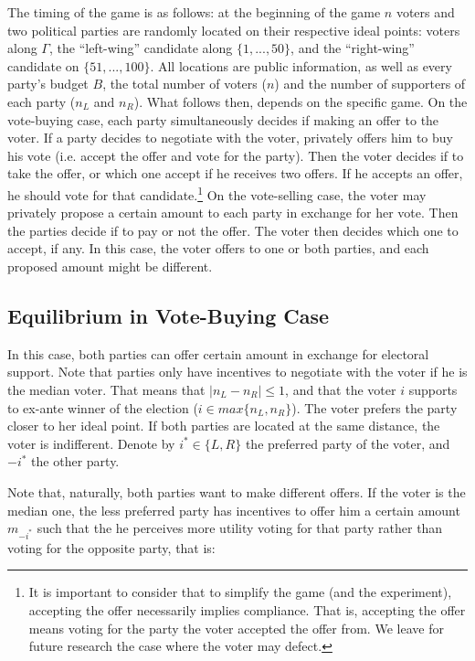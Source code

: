 \documentclass[onesided]{article}\usepackage[]{graphicx}\usepackage[]{color}
\begin{document}
The timing of the game is as follows: at the beginning of the game $n$ voters and two political parties are randomly located on their respective ideal points: voters along $\Gamma$, the ``left-wing'' candidate along $\{1,...,50\}$, and the ``right-wing'' candidate on $\{51,...,100\}$. All locations are public information, as well as {\color{red}every party's budget} $B$, the total number of voters ($n$) and the number of supporters of each party ($n_L$ and $n_R$). What follows then, depends on the specific game. On the vote-buying case, each party simultaneously decides if making an offer to the voter. If a party decides to negotiate with the voter, privately offers him to buy his vote (i.e. accept the offer and vote for the party). Then the voter decides if to take the offer, or which one accept if he receives two offers. If he accepts an offer, he should vote for that candidate.\footnote{It is important to consider that to simplify the game (and the experiment), accepting the offer necessarily implies compliance. That is, accepting the offer means voting for the party the voter accepted the offer from. We leave for future research the case where the voter may defect.} On the vote-selling case, the voter may privately propose a certain amount to each party in exchange for her vote. Then the parties decide if to pay or not the offer. The voter then decides which one to accept, if any. In this case, the voter offers to one or both parties, and each proposed amount might be different.

\subsection{Equilibrium in Vote-Buying Case}

In this case, both parties can offer certain amount in exchange for electoral support. Note that parties only have incentives to negotiate with the voter if he is the median voter. That means that $\vert n_L -n_R \vert \leq 1$, {\color{red}and that the voter $i$ supports to ex-ante winner of the election} ($i\in max\{n_L,n_R\}$). The voter prefers the party closer to her ideal point. If both parties are located at the same distance, the voter is indifferent. Denote by $i^*\in \{L,R\}$ the preferred party of the voter, and $-i^*$ the other party. 
 
 Note that, naturally, both parties want to make different offers. If the voter is the median one, the less preferred party has incentives to offer him a certain amount $m_{-i^*}$ such that the he perceives more utility voting for that party rather than voting for the opposite party, that is:
\end{document}
